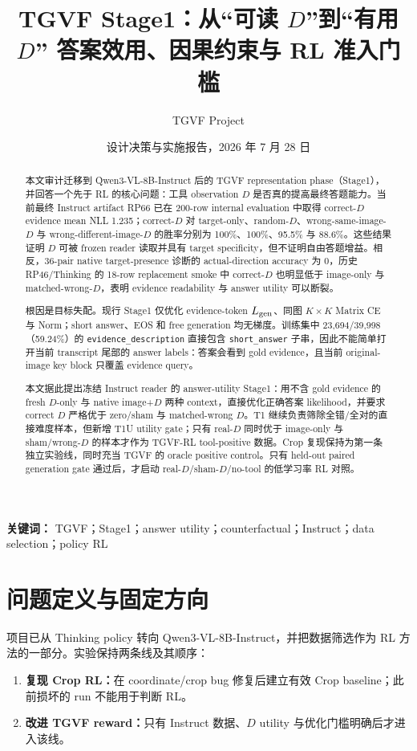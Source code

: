\documentclass[UTF8,twocolumn,10pt,a4paper]{ctexart}
\title{\vspace{-1.0em}\textbf{TGVF Stage1：从“可读 $D$”到“有用 $D$”\newline
答案效用、因果约束与 RL 准入门槛}}
\author{TGVF Project}
\date{设计决策与实施报告，2026 年 7 月 28 日}
\newcommand{\code}[1]{\texttt{#1}}
\begin{document}
\maketitle
\vspace{-1.55em}

\begin{abstract}
本文审计迁移到 Qwen3-VL-8B-Instruct 后的 TGVF representation phase（Stage1），并回答一个先于 RL 的核心问题：工具 observation $D$ 是否真的提高最终答题能力。当前最终 Instruct artifact RP66 已在 200-row internal evaluation 中取得 correct-$D$ evidence mean NLL 1.235；correct-$D$ 对 target-only、random-$D$、wrong-same-image-$D$ 与 wrong-different-image-$D$ 的胜率分别为 100\%、100\%、95.5\% 与 88.6\%。这些结果证明 $D$ 可被 frozen reader 读取并具有 target specificity，但不证明自由答题增益。相反，36-pair native target-presence 诊断的 actual-direction accuracy 为 0，历史 RP46/Thinking 的 18-row replacement smoke 中 correct-$D$ 也明显低于 image-only 与 matched-wrong-$D$，表明 evidence readability 与 answer utility 可以断裂。

根因是目标失配。现行 Stage1 仅优化 evidence-token $L_{\rm gen}$、同图 $K\!\times\!K$ Matrix CE 与 Norm；short answer、EOS 和 free generation 均无梯度。训练集中 23,694/39,998（59.24\%）的 \code{evidence\_description} 直接包含 \code{short\_answer} 子串，因此不能简单打开当前 transcript 尾部的 answer labels：答案会看到 gold evidence，且当前 original-image key block 只覆盖 evidence query。

本文据此提出冻结 Instruct reader 的 answer-utility Stage1：用不含 gold evidence 的 fresh $D$-only 与 native image+$D$ 两种 context，直接优化正确答案 likelihood，并要求 correct $D$ 严格优于 zero/sham 与 matched-wrong $D$。T1 继续负责筛除全错/全对的直接难度样本，但新增 T1U utility gate；只有 real-$D$ 同时优于 image-only 与 sham/wrong-$D$ 的样本才作为 TGVF-RL tool-positive 数据。Crop 复现保持为第一条独立实验线，同时充当 TGVF 的 oracle positive control。只有 held-out paired generation gate 通过后，才启动 real-$D$/sham-$D$/no-tool 的低学习率 RL 对照。
\end{abstract}

\noindent\textbf{关键词：} TGVF；Stage1；answer utility；counterfactual；Instruct；data selection；policy RL

\section{问题定义与固定方向}

项目已从 Thinking policy 转向 Qwen3-VL-8B-Instruct，并把数据筛选作为 RL 方法的一部分。实验保持两条线及其顺序：
\begin{enumerate}
  \item \textbf{复现 Crop RL：}在 coordinate/crop bug 修复后建立有效 Crop baseline；此前损坏的 run 不能用于判断 RL。
  \item \textbf{改进 TGVF reward：}只有 Instruct 数据、$D$ utility 与优化门槛明确后才进入该线。
\end{enumerate}
\end{document}
